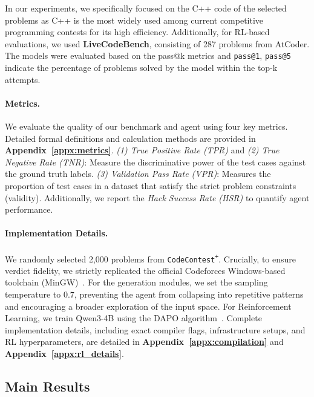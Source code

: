 \documentclass[11pt]{article}
\newcommand{\pl}{\textsuperscript{+}}
\begin{document}
In our experiments, we specifically focused on the C++ code of the selected problems as C++ is the most widely used among current competitive programming contests for its high efficiency. Additionally, for RL-based evaluations, we used \textbf{LiveCodeBench}, consisting of 287 problems from AtCoder. The models were evaluated based on the pass@k metrics and \texttt{pass@1}, \texttt{pass@5} indicate the percentage of problems solved by the model within the top-k attempts.

\paragraph{Metrics.} 
We evaluate the quality of our benchmark and agent using four key metrics. Detailed formal definitions and calculation methods are provided in \textbf{Appendix~\ref{appx:metrics}}.
\emph{(1) True Positive Rate (TPR)} and \emph{(2) True Negative Rate (TNR)}: Measure the discriminative power of the test cases against the ground truth labels.
\emph{(3) Validation Pass Rate (VPR)}: Measures the proportion of test cases in a dataset that satisfy the strict problem constraints (validity).
Additionally, we report the \emph{Hack Success Rate (HSR)} to quantify agent performance.

\paragraph{Implementation Details.} 
We randomly selected 2,000 problems from \texttt{CodeContest\pl}. Crucially, to ensure verdict fidelity, we strictly replicated the official Codeforces Windows-based toolchain (MinGW)~\cite{codeforces_cmd}. For the generation modules, we set the sampling temperature to $0.7$, preventing the agent from collapsing into repetitive patterns and encouraging a broader exploration of the input space.
For Reinforcement Learning, we train Qwen3-4B using the DAPO algorithm~\cite{yu2025dapo}. 
Complete implementation details, including exact compiler flags, infrastructure setups, and RL hyperparameters, are detailed in \textbf{Appendix~\ref{appx:compilation}} and \textbf{Appendix~\ref{appx:rl_details}}.

\subsection{Main Results}
\end{document}
